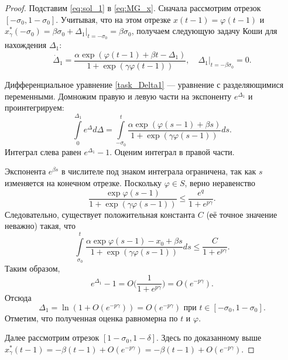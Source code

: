 \begin{proof}
Подставим \eqref{eq:sol_1} в \eqref{eq:MG_x}. Сначала рассмотрим отрезок $[-\sigma_0, 1 - \sigma_0]$. Учитывая, что на этом отрезке $x(t - 1) = \varphi(t - 1)$ и $x_\gamma^*(-\sigma_0) = \beta \sigma_0 +\Delta_1|_{t = -\sigma_0} = \beta \sigma_0$, получаем следующую задачу Коши для нахождения $\Delta_1$: 
\begin{equation}
	\label{task_Delta1}
	\dot{\Delta}_1=\frac{\alpha \exp(\varphi(t-1) + \beta t - \Delta_1)}{1 + \exp(\gamma\varphi(t-1))},\quad \Delta_1|_{t = -\beta \sigma_0}=0.
\end{equation}

Дифференциальное уравнение \eqref{task_Delta1} --- уравнение с разделяющимися переменными. Домножим правую и левую части на экспоненту $e^{\Delta_1}$ и проинтегрируем:
%
\[
\int\limits_0^{\Delta_1} e^\Delta d\Delta=\int\limits_{-\sigma_0}^t \frac{\alpha \exp(\varphi(s-1) + \beta s)}{1 + \exp(\gamma\varphi(s - 1))}ds.
\]
%
Интеграл слева равен $e^{\Delta_1} - 1$. Оценим интеграл в правой части.

Экспонента $e^{\beta s}$ в числителе под знаком интеграла ограничена, так как $s$ изменяется на конечном отрезке. Поскольку $\varphi\in S$, верно неравенство
%
\[
\frac{\exp\varphi(s - 1)}{1 + \exp(\gamma\varphi(s - 1))} \leqslant \frac{e^q}{1 + e^{p \gamma}}.
\]
Следовательно, существует положительная константа $C$ (её точное значение неважно) такая, что
\[
\int\limits_{\sigma_0}^t\frac{\alpha\exp\varphi(s-1)-x_0+\beta s}{1+\exp(\gamma\varphi(s-1))}ds\leqslant\frac{C}{1+e^{p \gamma}}.
\]
%
Таким образом, 
\[
e^{\Delta_1}-1=O\Big(\frac{1}{1+e^{p \gamma}}\Big)=O(e^{-p \gamma}).
\]
Отсюда 
\[
\Delta_1=\ln(1+O(e^{-p \gamma}))=O(e^{-p \gamma}) \text{ при }t\in[-\sigma_0, 1 - \sigma_0].
\]
Отметим, что полученная оценка равномерна по $t$ и $\varphi$.

Далее рассмотрим отрезок $[1 - \sigma_0, 1 - \delta]$. Здесь по доказанному выше $x_\gamma^*(t - 1) = -\beta (t-1) + O(e^{-p\gamma}) = -\beta (t-1) + O(e^{-p\gamma})$.


\end{proof}
